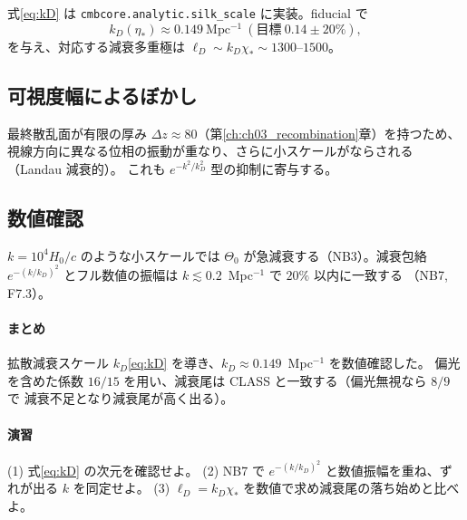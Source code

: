 \begin{numreality}
式\eqref{eq:kD} は \texttt{cmbcore.analytic.silk\_scale} に実装。fiducial で
\begin{equation}
  k_D(\eta_*)\approx0.149~\mathrm{Mpc^{-1}}\ (\text{目標}\ 0.14\pm20\%),
\end{equation}
を与え、対応する減衰多重極は $\ell_D\sim k_D\chi_*\sim1300$--$1500$。
\end{numreality}

\subsection{可視度幅によるぼかし}
最終散乱面が有限の厚み $\Delta z\approx80$（第\ref{ch:ch03_recombination}章）を持つため、
視線方向に異なる位相の振動が重なり、さらに小スケールがならされる（Landau 減衰的）。
これも $e^{-k^2/k_D^2}$ 型の抑制に寄与する。

\subsection{数値確認}
$k=10^4 H_0/c$ のような小スケールでは $\Theta_0$ が急減衰する（NB3）。減衰包絡
$e^{-(k/k_D)^2}$ とフル数値の振幅は $k\lesssim0.2$~Mpc$^{-1}$ で $20\%$ 以内に一致する
（NB7, F7.3）。

\paragraph{まとめ}
拡散減衰スケール $k_D$\eqref{eq:kD} を導き、$k_D\approx0.149$~Mpc$^{-1}$ を数値確認した。
偏光を含めた係数 $16/15$ を用い、減衰尾は CLASS と一致する（偏光無視なら $8/9$ で
減衰不足となり減衰尾が高く出る）。

\paragraph{演習}
(1) 式\eqref{eq:kD} の次元を確認せよ。
(2) NB7 で $e^{-(k/k_D)^2}$ と数値振幅を重ね、ずれが出る $k$ を同定せよ。
(3) $\ell_D=k_D\chi_*$ を数値で求め減衰尾の落ち始めと比べよ。
